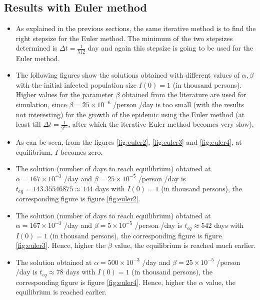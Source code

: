 \documentclass[11pt, a4paper, twoside]{report}
\begin{document}
\subsection{Results with Euler method}

\begin{itemize}
\item As explained in the previous sections, the same iterative method is to find the right stepsize for the Euler method. The minimum of the two stepsizes determined is $\Delta t = \frac{1}{512}$ day and again this stepsize is going to be used for the Euler method.  

\item The following figures show the solutions obtained with different values of $\alpha, \beta$ with the initial infected population size $I(0)=1$ (in thousand persons). Higher values for the parameter $\beta$ obtained from the literature are used for simulation, since $\beta=25 \times 10^{-6}$ /person /day is too small (with the results not interesting) for the growth of the epidemic using the Euler method (at least till $\Delta t=\frac{1}{2^15}$, after which the iterative Euler method becomes very slow).

\item As can be seen, from the figures \ref{fig:euler2}, \ref{fig:euler3} and \ref{fig:euler4}, at equilibrium, $I$ becomes zero. 

\item The solution (number of days to reach equilibrium) obtained at $\alpha=167 \times 10^{-3}$ /day and $\beta=25 \times 10^{-5}$ /person /day is $t_{eq}=143.35546875 \approx 144$ days with $I(0)=1$  (in thousand persons), the corresponding figure is figure \ref{fig:euler2}. 

\item The solution (number of days to reach equilibrium) obtained at $\alpha=167 \times 10^{-3}$ /day and $\beta=5 \times 10^{-5}$ /person /day is $t_{eq} \approx 542$ days with $I(0)=1$  (in thousand persons), the corresponding figure is figure \ref{fig:euler3}. Hence, higher the $\beta$ value, the equilibrium is reached much earlier. 

\item The solution obtained at $\alpha=500 \times 10^{-3}$ /day and $\beta=25 \times 10^{-5}$ /person /day is $t_{eq} \approx 78$ days with $I(0)=1$  (in thousand persons), the corresponding figure is figure \ref{fig:euler4}. Hence, higher the $\alpha$ value, the equilibrium is reached earlier. 


\end{itemize}
\end{document}
